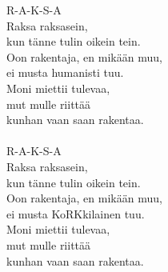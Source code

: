 
R-A-K-S-A \\ Raksa raksasein, \\ kun tänne tulin oikein tein. \\ Oon rakentaja, en mikään muu, \\ ei musta humanisti tuu. \\ Moni miettii tulevaa, \\ mut mulle riittää \\ kunhan vaan saan rakentaa. \\ \hspace{10mm} \\ R-A-K-S-A \\ Raksa raksasein, \\ kun tänne tulin oikein tein. \\ Oon rakentaja, en mikään muu, \\ ei musta KoRKkilainen tuu. \\ Moni miettii tulevaa, \\ mut mulle riittää \\ kunhan vaan saan rakentaa.